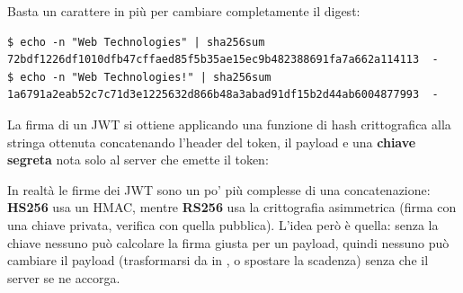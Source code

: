 
Basta un carattere in più per cambiare completamente il digest:
\begin{lstlisting}[style=shell, name=Terminale]
$ echo -n "Web Technologies" | sha256sum
72bdf1226df1010dfb47cffaed85f5b35ae15ec9b482388691fa7a662a114113  -
$ echo -n "Web Technologies!" | sha256sum
1a6791a2eab52c7c71d3e1225632d866b48a3abad91df15b2d44ab6004877993  -
\end{lstlisting}

La firma di un JWT si ottiene applicando una funzione di hash crittografica alla stringa ottenuta concatenando l'header
del token, il payload e una \textbf{chiave segreta} nota solo al server che emette il token:
\begin{center}
\end{center}
In realtà le firme dei JWT sono un po' più complesse di una concatenazione: \textbf{HS256} usa un HMAC, mentre
\textbf{RS256} usa la crittografia asimmetrica (firma con una chiave privata, verifica con quella pubblica). L'idea però è
quella: senza la chiave nessuno può calcolare la firma giusta per un payload, quindi nessuno può cambiare il payload
(trasformarsi da  in , o spostare la scadenza) senza che il server se ne accorga.

